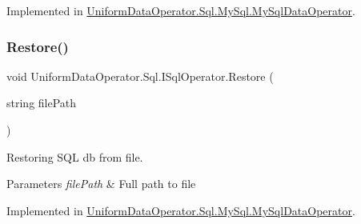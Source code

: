 Implemented in \mbox{\hyperlink{class_uniform_data_operator_1_1_sql_1_1_my_sql_1_1_my_sql_data_operator_ae7ad4f4d29d927fa8551b087a6e596b5}{Uniform\+Data\+Operator.\+Sql.\+My\+Sql.\+My\+Sql\+Data\+Operator}}.

\mbox{\label{interface_uniform_data_operator_1_1_sql_1_1_i_sql_operator_acf6fdbfc57a21efc371e0772244defd5}} 
\subsubsection{\texorpdfstring{Restore()}{Restore()}}
{\footnotesize\ttfamily void Uniform\+Data\+Operator.\+Sql.\+I\+Sql\+Operator.\+Restore (\begin{DoxyParamCaption}\item[{string}]{file\+Path }\end{DoxyParamCaption})}



Restoring S\+QL db from file. 


\begin{DoxyParams}{Parameters}
{\em file\+Path} & Full path to file\\
\hline
\end{DoxyParams}


Implemented in \mbox{\hyperlink{class_uniform_data_operator_1_1_sql_1_1_my_sql_1_1_my_sql_data_operator_a22a9e92989ebdb3a52b8ebe409c59831}{Uniform\+Data\+Operator.\+Sql.\+My\+Sql.\+My\+Sql\+Data\+Operator}}.

\mbox{\label{interface_uniform_data_operator_1_1_sql_1_1_i_sql_operator_a9a1822fcafcb1a3abd59b40f2cef7930}} 
